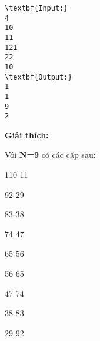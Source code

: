 \begin{verbatim}
\textbf{Input:}
4
10
11
121
22
10
\textbf{Output:}
1
1
9
2\end{verbatim}

\textbf{Giải thích:}


Với\textbf{ N=9} có các cặp sau:


110 11


92 29


83 38


74 47


65 56


56 65


47 74


38 83


29 92